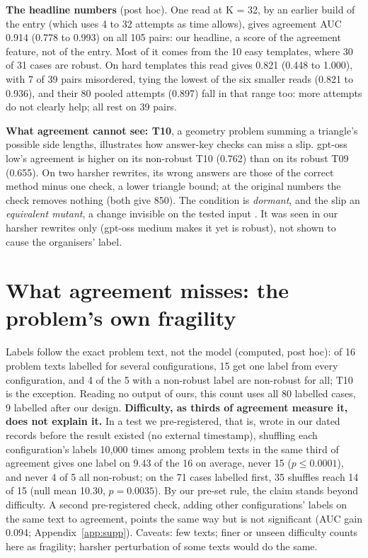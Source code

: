 \documentclass{article}
\begin{document}
\textbf{The headline numbers} (post hoc). One read at K = 32, by an earlier build of the entry (which uses 4 to 32
attempts as time allows), gives agreement AUC 0.914 (0.778 to 0.993) on all 105 pairs: our headline, a
score of the agreement feature, not of the entry. Most of it comes from the 10 easy
templates, where 30 of 31 cases are robust. On hard templates this read gives 0.821 (0.448 to 1.000), with 7 of 39
pairs misordered, tying the lowest of the six smaller reads (0.821 to 0.936), and their 80 pooled attempts (0.897) fall
in that range too: more attempts do not clearly help; all rest on 39 pairs.

\textbf{What agreement cannot see: T10}, a geometry problem summing a triangle's possible side lengths, illustrates how
answer-key checks can miss a slip. gpt-oss low's agreement is higher on its non-robust T10 (0.762) than on its robust
T09 (0.655). On two harsher rewrites, its wrong answers are those of the correct method minus one check, a lower
triangle bound; at the original numbers the check removes nothing (both give 850). The condition is \emph{dormant}, and
the slip an \emph{equivalent mutant}, a change invisible on the tested input \citep{papadakis2015}. It was seen in our
harsher rewrites only (gpt-oss medium makes it yet is robust), not shown to cause the organisers' label.

\section{What agreement misses: the problem's own fragility}
\label{sec:miss}

Labels follow the exact problem text, not the model (computed, post hoc): of 16 problem texts labelled for several
configurations, 15 get one label from every configuration, and 4 of the 5 with a non-robust label are non-robust for
all; T10 is the exception. Reading no output of ours, this count uses all 80 labelled cases, 9 labelled after our
design. \textbf{Difficulty, as thirds of agreement measure it, does not explain it.} In a test we pre-registered, that
is, wrote in our dated records before the result existed (no external timestamp), shuffling each configuration's
labels 10,000 times among problem texts in the same third of agreement gives one label on 9.43 of the 16 on average,
never 15 ($p \leq 0.0001$), and never 4 of 5 all non-robust; on the 71 cases labelled first, 35 shuffles reach 14 of
15 (null mean 10.30, $p = 0.0035$). By our pre-set rule, the claim stands beyond difficulty. A second pre-registered
check, adding other configurations' labels on the same text to agreement, points the same way but is not significant
(AUC gain 0.094; Appendix~\ref{app:supp}). Caveats: few texts; finer or unseen difficulty counts here as fragility;
harsher perturbation of some texts would do the same.
\end{document}
